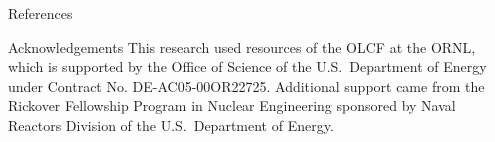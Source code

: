 \documentclass[final]{beamer}
\begin{document}
\begin{frame}{}
\begin{columns}[t]
\begin{column}{.3\linewidth}
        	\begin{block}{\large References}
			\printbibliography
        	\end{block}
			\vfill
        	\begin{block}{\large Acknowledgements}
		\justifying
This research used resources of the OLCF at the ORNL, which is supported by the Office of Science of the U.S.\ Department of Energy under Contract No. DE-AC05-00OR22725. Additional support came from the Rickover Fellowship Program in Nuclear Engineering sponsored by Naval Reactors Division of the U.S.\ Department of Energy.
        	\end{block}
      \end{column}
    \end{columns}
  \end{frame}
\end{document}
